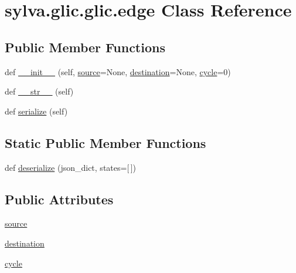 \hypertarget{classsylva_1_1glic_1_1glic_1_1edge}{}\section{sylva.\+glic.\+glic.\+edge Class Reference}
\label{classsylva_1_1glic_1_1glic_1_1edge}
\subsection*{Public Member Functions}
\begin{DoxyCompactItemize}
\item 
def \hyperlink{classsylva_1_1glic_1_1glic_1_1edge_a457302dcf6988c35a0dc6eb4910700d5}{\+\_\+\+\_\+init\+\_\+\+\_\+} (self, \hyperlink{classsylva_1_1glic_1_1glic_1_1edge_aa146acae3a8559c93674c0eed281b0e4}{source}=None, \hyperlink{classsylva_1_1glic_1_1glic_1_1edge_acf42bd33991b904735939bb747c11837}{destination}=None, \hyperlink{classsylva_1_1glic_1_1glic_1_1edge_a45ab1a0c555bf140cede412b7e8ceb95}{cycle}=0)
\item 
def \hyperlink{classsylva_1_1glic_1_1glic_1_1edge_a59d470622b60a6b3954eaad408779d2e}{\+\_\+\+\_\+str\+\_\+\+\_\+} (self)
\item 
def \hyperlink{classsylva_1_1glic_1_1glic_1_1edge_a3fecc788dfeea26b5005b6263dfe3088}{serialize} (self)
\end{DoxyCompactItemize}
\subsection*{Static Public Member Functions}
\begin{DoxyCompactItemize}
\item 
def \hyperlink{classsylva_1_1glic_1_1glic_1_1edge_a1430a92ec5530e5c4dc8bd7109f356a7}{deserialize} (json\+\_\+dict, states=\mbox{[}$\,$\mbox{]})
\end{DoxyCompactItemize}
\subsection*{Public Attributes}
\begin{DoxyCompactItemize}
\item 
\hyperlink{classsylva_1_1glic_1_1glic_1_1edge_aa146acae3a8559c93674c0eed281b0e4}{source}
\item 
\hyperlink{classsylva_1_1glic_1_1glic_1_1edge_acf42bd33991b904735939bb747c11837}{destination}
\item 
\hyperlink{classsylva_1_1glic_1_1glic_1_1edge_a45ab1a0c555bf140cede412b7e8ceb95}{cycle}
\end{DoxyCompactItemize}
